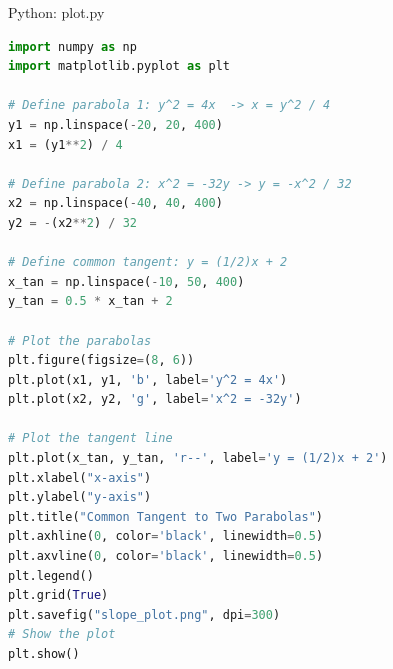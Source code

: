 \documentclass{beamer}
\numberwithin{equation}{section}
\theoremstyle{remark}
\begin{document}
\begin{frame}[fragile]{Python: plot.py}
\begin{lstlisting}[language=Python]
import numpy as np
import matplotlib.pyplot as plt

# Define parabola 1: y^2 = 4x  -> x = y^2 / 4
y1 = np.linspace(-20, 20, 400)
x1 = (y1**2) / 4

# Define parabola 2: x^2 = -32y -> y = -x^2 / 32
x2 = np.linspace(-40, 40, 400)
y2 = -(x2**2) / 32

# Define common tangent: y = (1/2)x + 2
x_tan = np.linspace(-10, 50, 400)
y_tan = 0.5 * x_tan + 2

# Plot the parabolas
plt.figure(figsize=(8, 6))
plt.plot(x1, y1, 'b', label='y^2 = 4x')
plt.plot(x2, y2, 'g', label='x^2 = -32y')

# Plot the tangent line
plt.plot(x_tan, y_tan, 'r--', label='y = (1/2)x + 2')
plt.xlabel("x-axis")
plt.ylabel("y-axis")
plt.title("Common Tangent to Two Parabolas")
plt.axhline(0, color='black', linewidth=0.5)
plt.axvline(0, color='black', linewidth=0.5)
plt.legend()
plt.grid(True)
plt.savefig("slope_plot.png", dpi=300)
# Show the plot
plt.show()

\end{lstlisting}
\end{frame}
\end{document}
